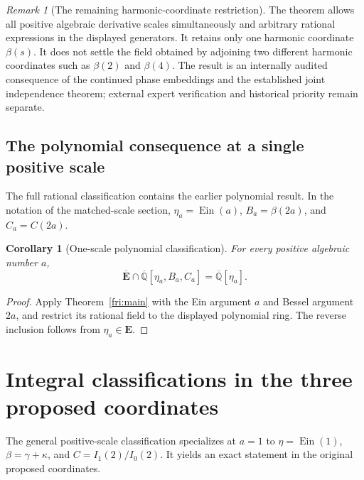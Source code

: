 \documentclass[11pt]{article}
\newtheorem{corollary}[theorem]{Corollary}
\theoremstyle{definition}
\theoremstyle{remark}
\newtheorem{remark}[theorem]{Remark}
\newcommand{\Qa}{\overline{\mathbb Q}}
\newcommand{\E}{\mathbf E}
\newcommand{\Ebar}{\overline{\mathbf E}}
\newcommand{\Ein}{\operatorname{Ein}}
\begin{document}
\begin{remark}[The remaining harmonic-coordinate restriction]
The theorem allows all positive algebraic derivative scales
simultaneously and arbitrary rational expressions in the displayed
generators.  It retains only one harmonic coordinate $\beta(s)$.
It does not settle the field obtained by adjoining two different
harmonic coordinates such as $\beta(2)$ and $\beta(4)$.
The result is an internally audited consequence of the continued
phase embeddings and the established joint independence theorem;
external expert verification and historical priority remain separate.
\end{remark}

\subsection{The polynomial consequence at a single positive scale}

The full rational classification contains the earlier polynomial result.
In the notation of the matched-scale section, $\eta_a=\Ein(a)$,
$B_a=\beta(2a)$, and $C_a=C(2a)$.

\begin{corollary}[One-scale polynomial classification]
\label{mre:polynomial}\label{etaclass:main}
For every positive algebraic number $a$,
\begin{equation}\label{mre:polynomial-equation}
 \Ebar\cap\Qa[\eta_a,B_a,C_a]=\Qa[\eta_a].
\end{equation}
\end{corollary}
\begin{proof}
Apply Theorem~\ref{fri:main} with the Ein argument $a$ and Bessel
argument $2a$, and restrict its rational field to the displayed
polynomial ring. The reverse inclusion follows from $\eta_a\in\E$.
\end{proof}

\section{Integral classifications in the three proposed coordinates}

The general positive-scale classification specializes at $a=1$ to
$\eta=\Ein(1)$, $\beta=\gamma+\kappa$, and $C=I_1(2)/I_0(2)$.
It yields an exact statement in the original proposed coordinates.
\end{document}
